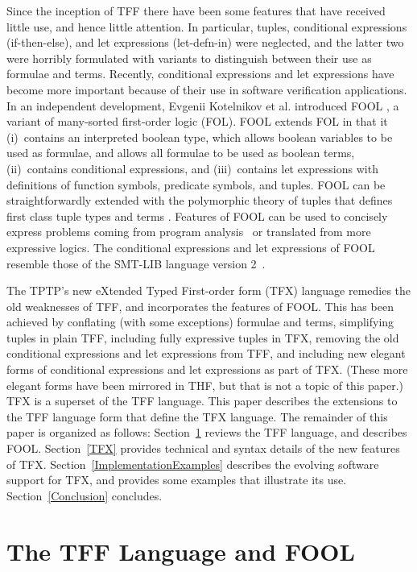 \documentclass{easychair}
\begin{document}
Since the inception of TFF there have been some features that have 
received little use, and hence little attention. 
In particular, tuples, conditional expressions (if-then-else), and let 
expressions (let-defn-in) were neglected, and the latter two were horribly 
formulated with variants to distinguish between their use as formulae and 
terms. 
Recently, conditional expressions and let expressions have become more 
important because of their use in software verification applications.
In an independent development, Evgenii Kotelnikov et al. introduced FOOL
\cite{KKV15}, a variant of many-sorted first-order logic (FOL).
FOOL extends FOL in that it (i)~contains an interpreted boolean type, which
allows boolean variables to be used as formulae, and allows all formulae to be 
used as boolean terms, (ii)~contains conditional expressions, and 
(iii)~contains let expressions with definitions of function symbols, predicate 
symbols, and tuples.
FOOL can be straightforwardly extended with the polymorphic theory of tuples 
that defines first class tuple types and terms \cite{KKV18}.
Features of FOOL can be used to concisely express problems coming from program
analysis~\cite{KKV18} or translated from more expressive logics. 
The conditional expressions and let expressions of FOOL resemble those of the 
SMT-LIB language version 2~\cite{BST10}.

The TPTP's new eXtended Typed First-order form (TFX) language remedies the
old weaknesses of TFF, and incorporates the features of FOOL.
This has been achieved by conflating (with some exceptions) formulae and 
terms, simplifying tuples in plain TFF, including fully expressive tuples in 
TFX, removing the old conditional expressions and let expressions from 
TFF, and including new elegant forms of conditional expressions and let 
expressions as part of TFX. 
(These more elegant forms have been mirrored in THF, but that is not a topic of
this paper.)
TFX is a superset of the TFF language. 
This paper describes the extensions to the TFF language form that define the 
TFX language.
The remainder of this paper is organized as follows:
Section~\ref{TPTPFOOL} reviews the TFF language, and describes FOOL.
Section~\ref{TFX} provides technical and syntax details of the new features 
of TFX.
Section~\ref{ImplementationExamples} describes the evolving software 
support for TFX, and provides some examples that illustrate its use.
Section~\ref{Conclusion} concludes.

\section{The TFF Language and FOOL}
\label{TPTPFOOL}
\end{document}
